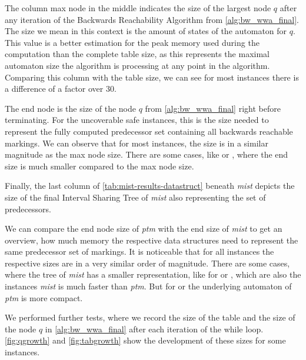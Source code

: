 The column max node in the middle indicates the size of the largest node $q$ after any iteration of the Backwards Reachability Algorithm from \autoref{alg:bw_wwa_final}. The size we mean in this context is the amount of states of the automaton for $q$. This value is a better estimation for the peak memory used during the computation than the complete table size, as this represents the maximal automaton size the algorithm is processing at any point in the algorithm. Comparing this column with the table size, we can see for most instances there is a difference of a factor over 30. 

The end node is the size of the node $q$ from \autoref{alg:bw_wwa_final} right before terminating. For the uncoverable safe instances, this is the size needed to represent the fully computed predecessor set containing all backwards reachable markings. We can observe that for most instances, the size is in a similar magnitude as the max node size. There are some cases, like  or , where the end size is much smaller compared to the max node size. 

Finally, the last column of \autoref{tab:mist-results-datastruct} beneath \textit{mist} depicts the size of the final Interval Sharing Tree of \textit{mist} also representing the set of predecessors.

We can compare the end node size of \textit{ptm} with the end size of  \textit{mist} to get an overview, how much memory the respective data structures need to represent the same predecessor set of markings. It is noticeable that for all instances the respective sizes are in a very similar order of magnitude. There are some cases, where the tree of \textit{mist} has a smaller representation, like for  or , which are also the instances \textit{mist} is much faster than \textit{ptm}. But for  or  the underlying automaton of \textit{ptm} is more compact. 

\bigbreak 

We performed further tests, where we record the size of the table and the size of the node $q$ in \autoref{alg:bw_wwa_final} after each iteration of the while loop. 
\autoref{fig:qgrowth} and \autoref{fig:tabgrowth} show the development of these sizes for some instances.


